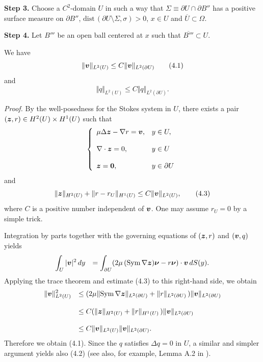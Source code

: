 {\bf\noindent Step 3.}
Choose a $C^2$-domain $U$ in such a way that $\Sigma\equiv \partial U\cap\partial B''$ has a positive surface measure on $\partial B''$, $\text{dist}\,(\partial U\setminus\Sigma,\sigma)>0$, $x\in U$ and $\overline{U}\subset\Omega$.  

{\bf\noindent Step 4.}  Let $B'''$ be an open ball centered at $x$ such that $\overline{B'''}\subset U$.




We have
$$\displaystyle
\Vert\mbox{\boldmath $v$}\Vert_{L^2(U)}
\le C
\Vert\mbox{\boldmath $v$}\Vert_{L^2(\partial U)}
\tag {4.1}
$$
and
$$\displaystyle
\Vert q\Vert_{L^2(U)}\le C\Vert q\Vert_{L^2(\partial U)}.
\tag {4.2}
$$
\endproclaim


{\it\noindent Proof.}
By the well-posedness for the Stokes system in $U$,  there exists a pair $(\mbox{\boldmath $z$}, r)\in H^2(U)\times H^1(U)$
such that
$$\left\{
\begin{array}{ll}
\displaystyle
\mu\Delta\mbox{\boldmath $z$}-\nabla r=\mbox{\boldmath $v$}, 
&
\displaystyle
y\in U,
\\
\\
\displaystyle
\nabla\cdot\mbox{\boldmath $z$}=0,
&
\displaystyle
y\in U\\
\\
\displaystyle
\mbox{\boldmath $z$}=\mbox{\boldmath $0$},
&
\displaystyle
y\in\partial U
\end{array}
\right.
$$
and 
$$\displaystyle
\Vert\mbox{\boldmath $z$}\Vert_{H^2(U)}+\Vert r-r_U\Vert_{H^1(U)}\le C\Vert\mbox{\boldmath $v$}\Vert_{L^2(U)},
\tag {4.3}
$$
where $C$ is a positive number independent of $\mbox{\boldmath $v$}$.
One may assume $r_U=0$ by a simple trick.

Integration by parts together with the governing equations of $(\mbox{\boldmath $z$}, r)$ and 
$(\mbox{\boldmath $v$},q)$ yields
$$\begin{array}{ll}
\displaystyle
\int_U\vert\mbox{\boldmath $v$}\vert^2\,dy
&
\displaystyle
=\int_{\partial U}(2\mu\,(\text{Sym}\,\nabla\mbox{\boldmath $z$})\mbox{\boldmath $\nu$}-r\mbox{\boldmath $\nu$})\cdot
\mbox{\boldmath $v$}\,dS(y).
\end{array}
$$
Applying  the trace theorem  and estimate (4.3) to this right-hand side, we obtain
$$\begin{array}
{ll}
\displaystyle
\Vert\mbox{\boldmath $v$}\Vert_{L^2(U)}^2
&
\displaystyle
\le (2\mu\Vert\text{Sym}\,\nabla\mbox{\boldmath $z$}\Vert_{L^2(\partial U)}+\Vert r\Vert_{L^2(\partial U)}\,)
\Vert\mbox{\boldmath $v$}\Vert_{L^2(\partial U)}
\\
\\
\displaystyle
&
\displaystyle
\le C(\Vert\mbox{\boldmath $z$}\Vert_{H^2(U)}+\Vert r\Vert_{H^1(U)}\,)\Vert\mbox{\boldmath $v$}\Vert_{L^2(\partial U)}
\\
\\
\displaystyle
&
\displaystyle
\le C\Vert\mbox{\boldmath $v$}\Vert_{L^2(U)}\Vert\mbox{\boldmath $v$}\Vert_{L^2(\partial U)}.
\end{array}
$$
Therefore we obtain (4.1).
Since the $q$ satisfies $\Delta q=0$ in $U$, a similar and simpler argument yields also (4.2) (see also, for example, Lemma A.2 in \cite{INew}).

